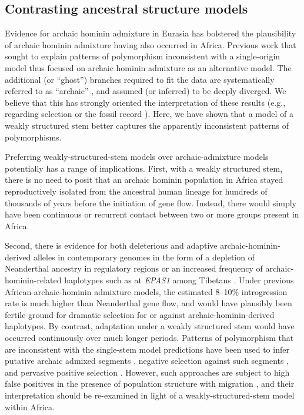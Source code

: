 \documentclass[]{article}
\begin{document}
\subsection*{Contrasting ancestral structure models}

Evidence for archaic hominin admixture in Eurasia has bolstered the
plausibility of archaic hominin admixture having also occurred in Africa.
Previous work that sought to explain patterns of polymorphism inconsistent with
a single-origin model thus focused on archaic hominin admixture as an
alternative model. The additional (or ``ghost'') branches required to fit the
data are systematically referred to as ``archaic''
\citep{Plagnol2006-lt,Hammer2011-bx,Hey2018-pw,Ragsdale2019-nt,
Lorente-Galdos2019-vz,Durvasula2020-td}, and assumed (or inferred) to be deeply
diverged. We believe that this has strongly oriented the interpretation of
these results (e.g., regarding selection \cite{Wall2019-ao} or the fossil
record \cite{Grun2020-su}). Here, we have shown that a model of a weakly
structured stem better captures the apparently inconsistent patterns of
polymorphisms.

Preferring weakly-structured-stem models over archaic-admixture models
potentially has a range of implications. First, with a weakly structured stem,
there is no need to posit that an archaic hominin population in Africa stayed
reproductively isolated from the ancestral human lineage for hundreds of thousands of
years before the initiation of gene flow. Instead, there would simply have
been continuous or recurrent contact between two or more groups present in
Africa. 

Second, there is evidence for both deleterious and adaptive
archaic-hominin-derived alleles in contemporary genomes in the form of a
depletion of Neanderthal ancestry in regulatory regions \citep{Petr2019-xo} or
an increased frequency of archaic-hominin-related haplotypes such as at
\emph{EPAS1} among Tibetans \citep{Zhang2021-xx}. Under previous
African-archaic-hominin admixture models, the estimated 8--10\% introgression rate is
much higher than Neanderthal gene flow, and would have plausibly been fertile
ground for dramatic selection for or against archaic-hominin-derived
haplotypes\citep{Wall2019-ao}. By contrast, adaptation under a weakly
structured stem would have occurred continuously over much longer periods.
Patterns of polymorphism that are inconsistent with the single-stem model
predictions have been used to infer putative archaic admixed segments
\citep{Plagnol2006-lt,Hsieh2016-gk,Wall2019-ao,Durvasula2020-td}, negative
selection against such segments \citep{Wall2019-ao}, and pervasive positive
selection \citep{Schrider2017-kl}. However, such approaches are subject to high
false positives in the presence of population structure with migration
\citep{Petr2019-xo}, and their interpretation should be re-examined in light of
a weakly-structured-stem model within Africa. 
\end{document}
